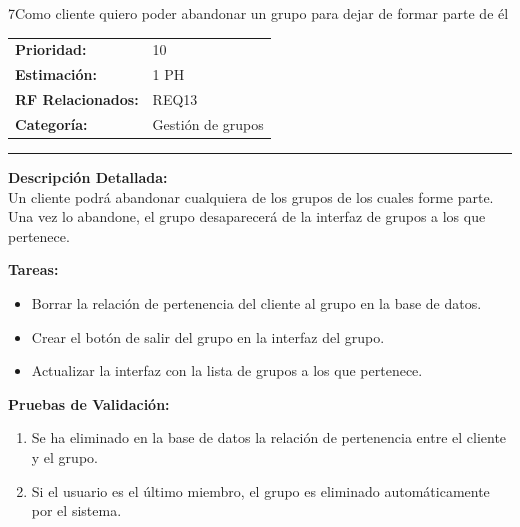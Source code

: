 \begin{hu_card}{7}{Como cliente quiero poder abandonar un grupo para dejar de formar parte de él}
    \begin{tabularx}{\linewidth}{l X}
        \textbf{Prioridad:}   & 10\\
        \textbf{Estimación:}  & 1 PH \\
        \textbf{RF Relacionados:} & REQ13 \\
        \textbf{Categoría:} & Gestión de grupos \\
    \end{tabularx}

    \vspace{2mm}
    \hrule
    \vspace{2mm}

    \textbf{Descripción Detallada:} \\
    Un cliente podrá abandonar cualquiera de los grupos de los cuales forme parte. Una vez lo abandone, el grupo desaparecerá de la interfaz de grupos a los que pertenece.

    \vspace{2mm}
    \textbf{Tareas:}
    \begin{itemize}[noitemsep, topsep=0pt]
        \item Borrar la relación de pertenencia del cliente al grupo en la base de datos.
        \item Crear el botón de salir del grupo en la interfaz del grupo.
        \item Actualizar la interfaz con la lista de grupos a los que pertenece.
    \end{itemize}

    \vspace{2mm}
    \textbf{Pruebas de Validación:}
    \begin{enumerate}[noitemsep, topsep=0pt]
        \item Se ha eliminado en la base de datos la relación de pertenencia entre el cliente y el grupo.
        \item Si el usuario es el último miembro, el grupo es eliminado automáticamente por el sistema.
    \end{enumerate}
\end{hu_card}

